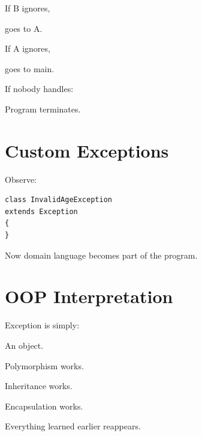 \documentclass[11pt,a4paper]{book}
\begin{document}
If B ignores,

goes to A.


If A ignores,

goes to main.


If nobody handles:


Program terminates.


\section{Custom Exceptions}

Observe:

\begin{verbatim} 
class InvalidAgeException
extends Exception
{
}
\end{verbatim}


Now domain language becomes
part of the program.


\section{OOP Interpretation}

Exception is simply:


An object.


Polymorphism works.


Inheritance works.


Encapsulation works.


Everything learned earlier
reappears.
\end{document}
